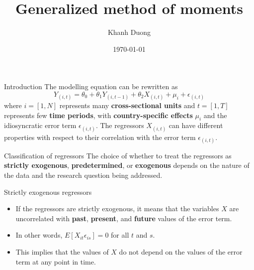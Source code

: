 \documentclass[color=usenames,dvipsnames]{beamer}
\title[Generalized method of moments]{Generalized method of moments}
\author{Khanh Duong}
\institute{Personal repository}
\date{\today}
\begin{document}
\begin{frame}
  \titlepage
\end{frame}



\begin{frame}{Introduction}
    The modelling equation can be rewritten as 
    \begin{equation}
    Y_{(i,t)} = \theta_0 + \theta_1 Y_{(i,t-1)} + \theta_2 X_{(i,t)} + \mu_i + \epsilon_{(i,t)}
    \label{eq:1}
    \end{equation}
    where \(i = [1, N]\) represents many \textbf{cross-sectional units} and \(t = [1, T]\) represents few \textbf{time periods}, with \textbf{country-specific effects} \(\mu_i\) and the idiosyncratic error term \(\epsilon_{(i,t)}\). The regressors \(X_{(i,t)}\) can have different properties with respect to their correlation with the error term \(\epsilon_{(i,t)}\).

    \vskip 0.5cm
    
    \begin{block}{Classification of regressors}
    The choice of whether to treat the regressors as \textbf{strictly exogenous}, \textbf{predetermined}, or \textbf{exogenous} depends on the nature of the data and the research question being addressed.
    \end{block}

\end{frame}

\begin{frame}{Strictly exogenous regressors}
    \begin{itemize}
    
        \item If the regressors are strictly exogenous, it means that the variables \(X\) are uncorrelated with \textbf{past}, \textbf{present}, and \textbf{future} values of the error term.
        
        \item In other words, \(E[X_{it}\epsilon_{is}] = 0\) for all \(t\) and \(s\).
        
        \item This implies that the values of \(X\) do not depend on the values of the error term at any point in time.
    
    \end{itemize}

\end{frame}
\end{document}
